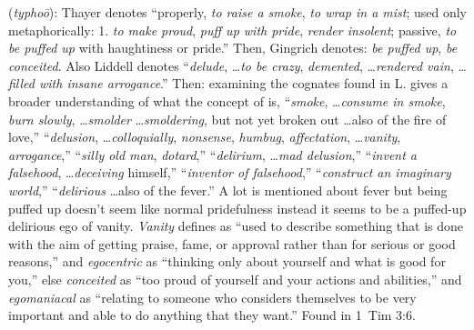 \item[Egomaniacal,]

(\textit{typhoō}):
Thayer denotes ``properly, \emph{to raise a smoke}, \emph{to wrap in a mist}; used only metaphorically:  1. \emph{to make proud}, \emph{puff up with pride}, \emph{render insolent}; passive, \emph{to be puffed up} with haughtiness or pride.'' Then, Gingrich denotes: \emph{be puffed up}, \emph{be conceited}. 
Also Liddell denotes  ``\emph{delude}, \ldots \emph{to be crazy}, \emph{demented}, \ldots \emph{rendered vain}, \ldots \emph{filled with insane arrogance}.''
Then: examining the cognates found in L. gives a broader understanding of what the concept of  is, 
 ``\emph{smoke}, \ldots \emph{consume in smoke}, \emph{burn slowly}, \ldots \emph{smolder} \ldots \emph{smoldering}, but not yet broken out \ldots also of the fire of love,''
 ``\emph{delusion}, \ldots \emph{colloquially}, \emph{nonsense}, \emph{humbug}, \emph{affectation}, \ldots \emph{vanity}, \emph{arrogance},''
 ``\emph{silly old man}, \emph{dotard},''
 ``\emph{delirium}, \ldots \emph{mad delusion},''
 ``\emph{invent a falsehood}, \ldots \emph{deceiving} himself,'' 
 ``\emph{inventor of falsehood},'' 
 ``\emph{construct an imaginary world},'' 
 ``\emph{delirious} \ldots also of the fever.'' 
A lot is mentioned about fever but being puffed up doesn't seem like normal pridefulness instead it seems to be a puffed-up delirious ego of vanity. \emph{Vanity} defines as ``used to describe something that is done with the aim of getting praise, fame, or approval rather than for serious or good reasons,'' and \emph{egocentric} as ``thinking only about yourself and what is good for you,'' else \emph{conceited} as ``too proud of yourself and your actions and abilities,'' and \emph{egomaniacal} as ``relating to someone who considers themselves to be very important and able to do anything that they want.''
Found in 1~Tim 3:6.
